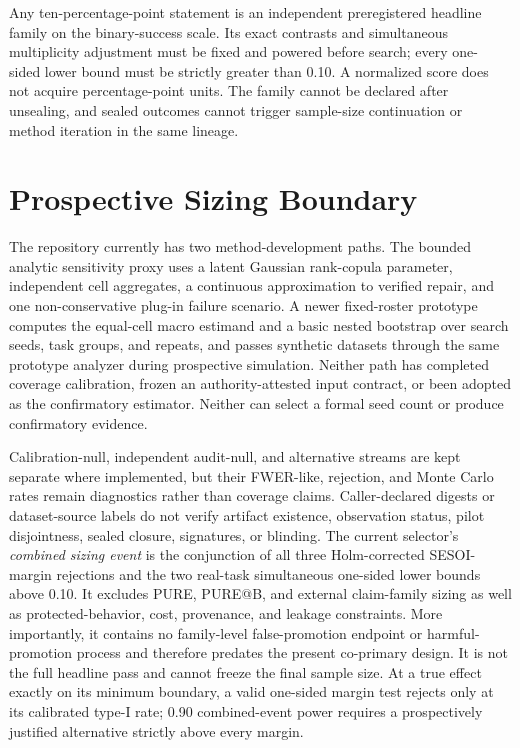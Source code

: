 Any ten-percentage-point statement is an independent preregistered headline
family on the binary-success scale.  Its exact contrasts and simultaneous
multiplicity adjustment must be fixed and powered before search; every one-
sided lower bound must be strictly greater than 0.10.  A normalized score does
not acquire percentage-point units.  The family cannot be declared after
unsealing, and sealed outcomes cannot trigger sample-size continuation or
method iteration in the same lineage.

\section{Prospective Sizing Boundary}
\label{app:power-proxy}

The repository currently has two method-development paths.  The bounded
analytic sensitivity proxy uses a latent Gaussian rank-copula parameter,
independent cell aggregates, a continuous approximation to verified repair,
and one non-conservative plug-in failure scenario.  A newer fixed-roster
prototype computes the equal-cell macro estimand and a basic nested bootstrap
over search seeds, task groups, and repeats, and passes synthetic datasets
through the same prototype analyzer during prospective simulation.  Neither
path has completed coverage calibration, frozen an authority-attested input
contract, or been adopted as the confirmatory estimator.  Neither can select a
formal seed count or produce confirmatory evidence.

Calibration-null, independent audit-null, and alternative streams are kept
separate where implemented, but their FWER-like, rejection, and Monte Carlo
rates remain diagnostics rather than coverage claims.  Caller-declared digests
or dataset-source labels do not verify artifact existence, observation status,
pilot disjointness, sealed closure, signatures, or blinding.  The current
selector's \emph{combined sizing event} is the conjunction of all three
Holm-corrected SESOI-margin rejections and the two real-task simultaneous
one-sided lower bounds above 0.10.  It excludes PURE, PURE@B, and external
claim-family sizing as well as protected-behavior, cost, provenance, and leakage
constraints.  More importantly, it contains no family-level false-promotion
endpoint or harmful-promotion process and therefore predates the present
co-primary design.  It is not the full headline pass and cannot freeze the
final sample size.  At a true effect exactly on its minimum boundary, a valid
one-sided margin test rejects only at its calibrated type-I rate; 0.90 combined-event
power requires a prospectively justified alternative strictly above every
margin.

